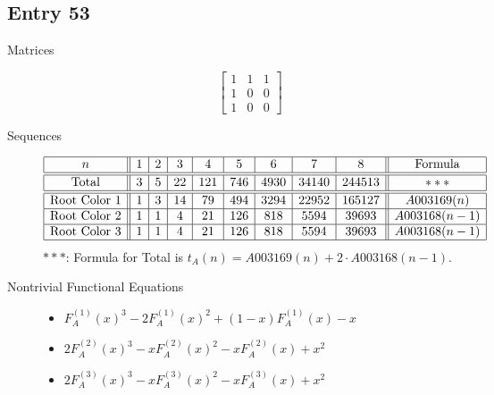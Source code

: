 \documentclass[12pt]{amsart}
\newcommand{\gff}[2]{F_{#2}^{(#1)}(x)}
\newcommand{\gfa}[1]{\gff{#1}{A}}
\begin{document}
\subsection*{Entry 53}
\begin{description}
    \item[Matrices]
    
    \[\begin{bmatrix}
1 & 1 & 1 \\
1 & 0 & 0 \\
1 & 0 & 0
\end{bmatrix}\]
    \item[Sequences]\hspace*{\fill}\vspace{-0.5cm}
    \begin{center}
        \[
        \begin{array}{|c||c|c|c|c|c|c|c|c||c|}\hline
           n  & 1 & 2 & 3 & 4 & 5 & 6 & 7 & 8  & \text{Formula}\\\hline\hline
           \text{Total}  & 3 & 5 & 22 & 121 & 746 & 4930 & 34140 & 244513 & ***\\\hline\hline
           \text{Root Color }1 & 1 & 3 & 14 & 79 & 494 & 3294 & 22952 & 165127 & A003169(n)\\\hline
           \text{Root Color }2 & 1 & 1 & 4 & 21 & 126 & 818 & 5594 & 39693 & A003168(n-1)\\\hline
           \text{Root Color }3 & 1 & 1 & 4 & 21 & 126 & 818 & 5594 & 39693 & A003168(n-1)\\\hline
        \end{array}
        \]
        $***$: Formula for Total is $t_A(n)=A003169(n)+2\cdot A003168(n-1)$.
    \end{center}
    
    \item[Nontrivial Functional Equations]\hspace*{\fill}

    \begin{itemize}
\item $\gfa{1}^3-2\gfa{1}^2+(1 - x)\gfa{1}-x$


\item $2\gfa{2}^3-x\gfa{2}^2-x\gfa{2}+x^2$


\item $2\gfa{3}^3-x\gfa{3}^2-x\gfa{3}+x^2$



\end{itemize}
\end{description}
\end{document}
